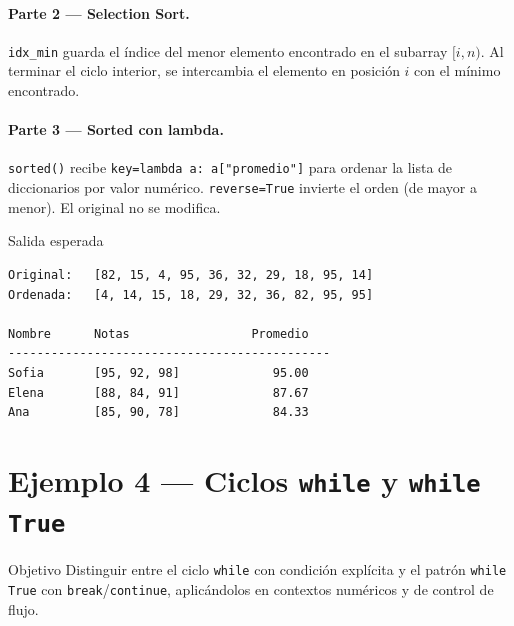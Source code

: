 \documentclass[12pt,a4paper]{article}
\begin{document}
\paragraph{Parte 2 — Selection Sort.}
\texttt{idx\_min} guarda el índice del menor elemento encontrado en el subarray
$[i, n)$.  Al terminar el ciclo interior, se intercambia el elemento en posición
$i$ con el mínimo encontrado.

\paragraph{Parte 3 — Sorted con lambda.}
\texttt{sorted()} recibe \texttt{key=lambda a: a["promedio"]} para ordenar la
lista de diccionarios por valor numérico. \texttt{reverse=True} invierte el orden
(de mayor a menor). El original no se modifica.

\vspace{0.6em}
\begin{salidabox}{Salida esperada}
\begin{lstlisting}[style=OutputStyle]
Original:   [82, 15, 4, 95, 36, 32, 29, 18, 95, 14]
Ordenada:   [4, 14, 15, 18, 29, 32, 36, 82, 95, 95]

Nombre      Notas                 Promedio
---------------------------------------------
Sofia       [95, 92, 98]             95.00
Elena       [88, 84, 91]             87.67
Ana         [85, 90, 78]             84.33
\end{lstlisting}
\end{salidabox}

\newpage
\section{Ejemplo 4 — Ciclos \texttt{while} y \texttt{while True}}
\label{sec:ejemplo4}

\begin{objetivobox}{Objetivo}
Distinguir entre el ciclo \texttt{while} con condición explícita y el patrón
\texttt{while True} con \texttt{break}/\texttt{continue}, aplicándolos en
contextos numéricos y de control de flujo.
\end{objetivobox}
\end{document}
